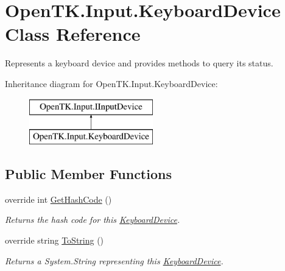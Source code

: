 \hypertarget{class_open_t_k_1_1_input_1_1_keyboard_device}{\section{Open\-T\-K.\-Input.\-Keyboard\-Device Class Reference}
\label{class_open_t_k_1_1_input_1_1_keyboard_device}
}


Represents a keyboard device and provides methods to query its status.  


Inheritance diagram for Open\-T\-K.\-Input.\-Keyboard\-Device\-:\begin{figure}[H]
\begin{center}
\leavevmode
\includegraphics[height=2.000000cm]{class_open_t_k_1_1_input_1_1_keyboard_device}
\end{center}
\end{figure}
\subsection*{Public Member Functions}
\begin{DoxyCompactItemize}
\item 
override int \hyperlink{class_open_t_k_1_1_input_1_1_keyboard_device_ac6151bee0c67b22b61c9b18232b861ca}{Get\-Hash\-Code} ()
\begin{DoxyCompactList}\small\item\em Returns the hash code for this \hyperlink{class_open_t_k_1_1_input_1_1_keyboard_device}{Keyboard\-Device}.\end{DoxyCompactList}\item 
override string \hyperlink{class_open_t_k_1_1_input_1_1_keyboard_device_abe5081c8f817eb2a52f3ae1d681038db}{To\-String} ()
\begin{DoxyCompactList}\small\item\em Returns a System.\-String representing this \hyperlink{class_open_t_k_1_1_input_1_1_keyboard_device}{Keyboard\-Device}. \end{DoxyCompactList}\end{DoxyCompactItemize}
